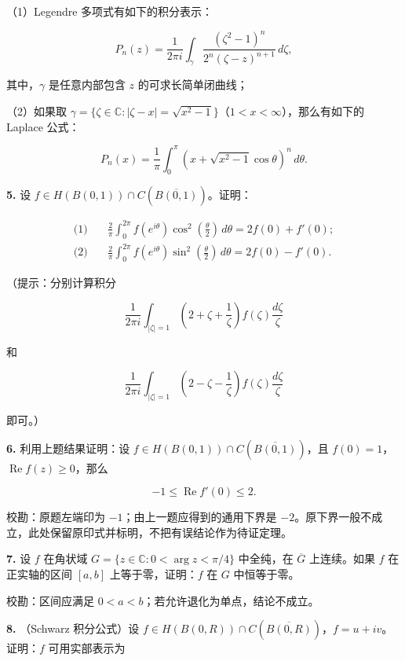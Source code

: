 \documentclass[11pt,a4paper]{article}
\begin{document}
（1）Legendre 多项式有如下的积分表示：

\[
P_n(z)=\frac1{2\pi i}\int_\gamma\frac{(\zeta^2-1)^n}{2^n(\zeta-z)^{n+1}}\,d\zeta,
\]

其中，\(\gamma\) 是任意内部包含 \(z\) 的可求长简单闭曲线；

（2）如果取
\(\gamma=\{\zeta\in\mathbb C:|\zeta-x|=\sqrt{x^2-1}\}\)（\(1<x<\infty\)），那么有如下的
Laplace 公式：

\[
P_n(x)=\frac1\pi\int_0^\pi\left(x+\sqrt{x^2-1}\cos\theta\right)^n\,d\theta.
\]

\par{}
\noindent\textbf{5.} 设 \(f\in H(B(0,1))\cap C(\overline{B(0,1)})\)。证明：

\[
\begin{aligned}
\text{(1)}\quad&\frac2\pi\int_0^{2\pi}f(e^{i\theta})\cos^2\left(\frac\theta2\right)\,d\theta=2f(0)+f'(0);\\
\text{(2)}\quad&\frac2\pi\int_0^{2\pi}f(e^{i\theta})\sin^2\left(\frac\theta2\right)\,d\theta=2f(0)-f'(0).
\end{aligned}
\]

（提示：分别计算积分

\[
\frac1{2\pi i}\int_{|\zeta|=1}\left(2+\zeta+\frac1\zeta\right)f(\zeta)\frac{d\zeta}{\zeta}
\]

和

\[
\frac1{2\pi i}\int_{|\zeta|=1}\left(2-\zeta-\frac1\zeta\right)f(\zeta)\frac{d\zeta}{\zeta}
\]

即可。）

\par{}
\noindent\textbf{6.} 利用上题结果证明：设
\(f\in H(B(0,1))\cap C(\overline{B(0,1)})\)，且
\(f(0)=1\)，\(\operatorname{Re}f(z)\ge0\)，那么

\[
-1\le\operatorname{Re}f'(0)\le2.
\]

校勘：原题左端印为 \(-1\)；由上一题应得到的通用下界是
\(-2\)。原下界一般不成立，此处保留原印式并标明，不把有误结论作为待证定理。

\par{}
\noindent\textbf{7.} 设 \(f\) 在角状域 \(G=\{z\in\mathbb C:0<\arg z<\pi/4\}\)
中全纯，在 \(\overline G\) 上连续。如果 \(f\) 在正实轴的区间 \([a,b]\)
上等于零，证明：\(f\) 在 \(G\) 中恒等于零。

校勘：区间应满足 \(0<a<b\)；若允许退化为单点，结论不成立。

\par{}
\noindent\textbf{8.} （Schwarz 积分公式）设
\(f\in H(B(0,R))\cap C(\overline{B(0,R)})\)，\(f=u+iv\)。证明：\(f\)
可用实部表示为
\end{document}
